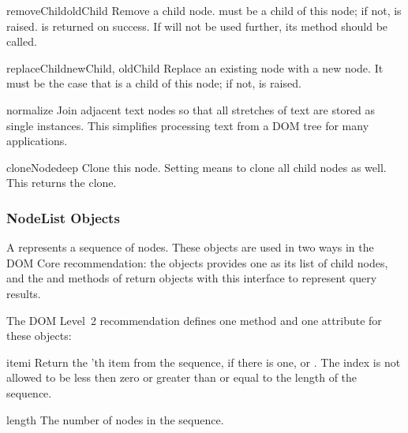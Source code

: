 \begin{methoddesc}[Node]{removeChild}{oldChild}
Remove a child node.   must be a child of this node; if
not,  is raised.   is returned on
success.  If  will not be used further, its
 method should be called.
\end{methoddesc}

\begin{methoddesc}[Node]{replaceChild}{newChild, oldChild}
Replace an existing node with a new node. It must be the case that 
 is a child of this node; if not,
 is raised.
\end{methoddesc}

\begin{methoddesc}[Node]{normalize}{}
Join adjacent text nodes so that all stretches of text are stored as
single  instances.  This simplifies processing text from a
DOM tree for many applications.
\end{methoddesc}

\begin{methoddesc}[Node]{cloneNode}{deep}
Clone this node.  Setting  means to clone all child nodes as
well.  This returns the clone.
\end{methoddesc}


\subsubsection{NodeList Objects \label{dom-nodelist-objects}}

A  represents a sequence of nodes.  These objects are
used in two ways in the DOM Core recommendation:  the
 objects provides one as its list of child nodes, and
the  and
 methods of  return
objects with this interface to represent query results.

The DOM Level~2 recommendation defines one method and one attribute
for these objects:

\begin{methoddesc}[NodeList]{item}{i}
  Return the 'th item from the sequence, if there is one, or
  .  The index  is not allowed to be less then zero
  or greater than or equal to the length of the sequence.
\end{methoddesc}

\begin{memberdesc}[NodeList]{length}
  The number of nodes in the sequence.
\end{memberdesc}

